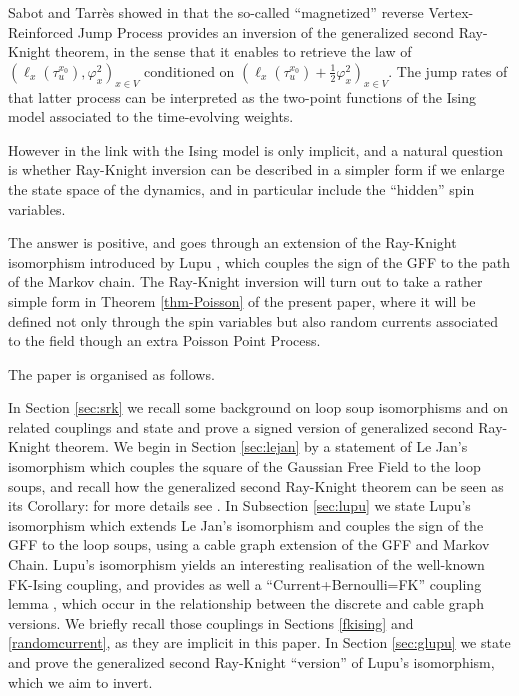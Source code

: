 \documentclass[11pt,a4paper]{amsart}
\numberwithin{equation}{section}
\begin{document}
Sabot and Tarrès showed in \cite{SabotTarres2015RK} that the so-called ``magnetized'' reverse Vertex-Reinforced Jump Process provides an inversion of the generalized second Ray-Knight theorem, in the sense that it enables to retrieve the law of $(\ell_x(\tau_u^{x_0}), \varphi^2_x)_{x\in V}$ conditioned on $\left(\ell_x(\tau_u^{x_0})+\frac{1}{2}\varphi^2_x\right)_{x\in V}$. The jump rates of that latter process can be interpreted as the two-point functions of the Ising model associated to the time-evolving weights.

However in \cite{SabotTarres2015RK} the link with the Ising model is only implicit, and a natural question is whether Ray-Knight inversion can be described in a simpler form if we enlarge the state space of the dynamics, and in particular include the ``hidden'' spin variables. 

The answer is positive, and goes through an extension  of the Ray-Knight isomorphism introduced by Lupu \cite{Lupu2014LoopsGFF}, which couples the sign of the GFF to the path of the Markov chain. The Ray-Knight inversion will turn out to take a rather simple form  in Theorem \ref{thm-Poisson} of the present paper, where it will be defined not only through the spin variables but also random currents associated to the field though an extra Poisson Point Process. 

The paper is organised as follows. 

In Section \ref{sec:srk} we recall some background on loop soup isomorphisms and on related couplings and state and prove a signed version of generalized second Ray-Knight theorem. We begin in Section \ref{sec:lejan} by a statement of Le Jan's isomorphism which couples the square of the Gaussian Free Field to the loop soups, and recall how the generalized second Ray-Knight theorem can be seen as its Corollary: for more details see \cite{lejan4}. In Subsection \ref{sec:lupu} we state Lupu's isomorphism which extends Le Jan's isomorphism and couples the  sign of the GFF to the loop soups, using  a  cable graph extension of the GFF and Markov Chain. Lupu's isomorphism yields an interesting realisation of the well-known  FK-Ising coupling,  and provides as well a ``Current+Bernoulli=FK'' coupling lemma \cite{lupu-werner}, which occur in the relationship between the discrete and cable graph versions. We briefly recall those couplings in Sections \ref{fkising} and \ref{randomcurrent}, as they are implicit in this paper. In Section \ref{sec:glupu} we state and prove the generalized second Ray-Knight ``version'' of Lupu's isomorphism, which we aim to invert. 
\end{document}

